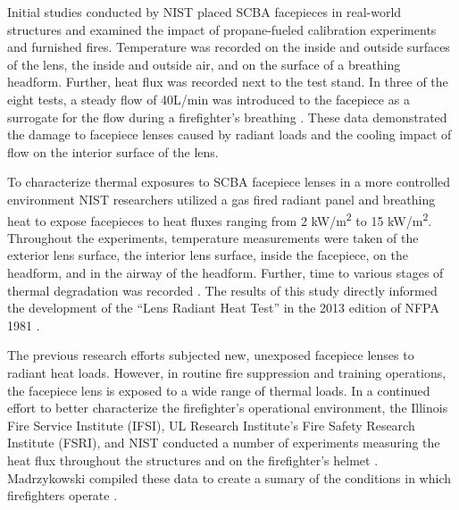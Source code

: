 \documentclass[sn-mathphys]{sn-jnl}%
\theoremstyle{thmstyleone}%
\theoremstyle{thmstyletwo}%
\theoremstyle{thmstylethree}%
\begin{document}
Initial studies conducted by NIST placed SCBA facepieces in real-world structures and examined the impact of propane-fueled calibration experiments and furnished fires. Temperature was recorded on the inside and outside surfaces of the lens, the inside and outside air, and on the surface of a breathing headform. Further, heat flux was recorded next to the test stand. In three of the eight tests, a steady flow of 40L/min was introduced to the facepiece as a surrogate for the flow during a firefighter’s breathing \cite{mensch_fire_2011}. These data demonstrated the damage to facepiece lenses caused by radiant loads and the cooling impact of flow on the interior surface of the lens. 

To characterize thermal exposures to SCBA facepiece lenses in a more controlled environment NIST researchers utilized a gas fired radiant panel and breathing heat to expose facepieces to heat fluxes ranging from 2 kW/m\textsuperscript{2} to 15 kW/m\textsuperscript{2}. Throughout the experiments, temperature measurements were taken of the exterior lens surface, the interior lens surface, inside the facepiece, on the headform, and in the airway of the headform. Further, time to various stages of thermal degradation was recorded \cite{putorti_thermal_2013}. The results of this study directly informed the development of the “Lens Radiant Heat Test” in the 2013 edition of NFPA 1981 \cite{national_fire_protection_association_nfpa_2013}. 

The previous research efforts subjected new, unexposed facepiece lenses to radiant heat loads. However, in routine fire suppression and training operations, the facepiece lens is exposed to a wide range of thermal loads. In a continued effort to better characterize the firefighter’s operational environment, the Illinois Fire Service Institute (IFSI), UL Research Institute's Fire Safety Research Institute (FSRI), and NIST conducted a number of experiments measuring the heat flux throughout the structures and on the firefighter’s helmet \cite{madrzykowski_townhouse_2011,willi_characterizing_2016,zevotek_impact_2018,kerber_effect_2019}. Madrzykowski compiled these data to create a sumary of the conditions in which firefighters operate \cite{madrzykowski_fire_2017}.


\end{document}
